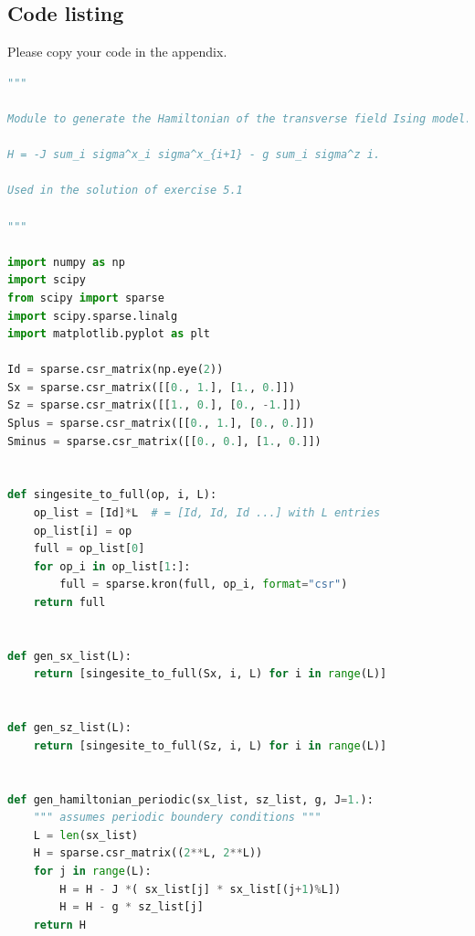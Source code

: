 \begin{widetext}
\section{Code listing} \label{app:codes}
Please copy your code in the appendix.
\begin{lstlisting}[language=Python]
"""

Module to generate the Hamiltonian of the transverse field Ising model.

H = -J sum_i sigma^x_i sigma^x_{i+1} - g sum_i sigma^z i.

Used in the solution of exercise 5.1

"""

import numpy as np
import scipy
from scipy import sparse
import scipy.sparse.linalg
import matplotlib.pyplot as plt

Id = sparse.csr_matrix(np.eye(2))
Sx = sparse.csr_matrix([[0., 1.], [1., 0.]])
Sz = sparse.csr_matrix([[1., 0.], [0., -1.]])
Splus = sparse.csr_matrix([[0., 1.], [0., 0.]])
Sminus = sparse.csr_matrix([[0., 0.], [1., 0.]])


def singesite_to_full(op, i, L):
    op_list = [Id]*L  # = [Id, Id, Id ...] with L entries
    op_list[i] = op
    full = op_list[0]
    for op_i in op_list[1:]:
        full = sparse.kron(full, op_i, format="csr")
    return full


def gen_sx_list(L):
    return [singesite_to_full(Sx, i, L) for i in range(L)]


def gen_sz_list(L):
    return [singesite_to_full(Sz, i, L) for i in range(L)]


def gen_hamiltonian_periodic(sx_list, sz_list, g, J=1.):
    """ assumes periodic boundery conditions """
    L = len(sx_list)
    H = sparse.csr_matrix((2**L, 2**L))
    for j in range(L):
        H = H - J *( sx_list[j] * sx_list[(j+1)%L])
        H = H - g * sz_list[j]
    return H
\end{lstlisting}
\end{widetext}